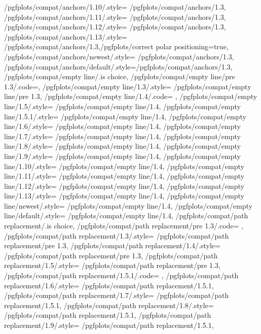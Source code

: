 {	/pgfplots/compat/anchors/1.10/.style= 	{/pgfplots/compat/anchors/1.3},%
	/pgfplots/compat/anchors/1.11/.style= 	{/pgfplots/compat/anchors/1.3},%
	/pgfplots/compat/anchors/1.12/.style= 	{/pgfplots/compat/anchors/1.3},%
	/pgfplots/compat/anchors/1.13/.style= 	{/pgfplots/compat/anchors/1.3,/pgfplots/correct polar positioning=true},%
	/pgfplots/compat/anchors/newest/.style= {/pgfplots/compat/anchors/1.3},%
	/pgfplots/compat/anchors/default/.style={/pgfplots/compat/anchors/1.3},%
	/pgfplots/compat/empty line/.is choice,
	/pgfplots/compat/empty line/pre 1.3/.code={\pgfplots@emptyline@compattrue},%
	/pgfplots/compat/empty line/1.3/.style= {/pgfplots/compat/empty line/pre 1.3},%
	/pgfplots/compat/empty line/1.4/.code= 	{\pgfplots@emptyline@compatfalse},%
	/pgfplots/compat/empty line/1.5/.style= 	{/pgfplots/compat/empty line/1.4},%
	/pgfplots/compat/empty line/1.5.1/.style= 	{/pgfplots/compat/empty line/1.4},%
	/pgfplots/compat/empty line/1.6/.style= 	{/pgfplots/compat/empty line/1.4},%
	/pgfplots/compat/empty line/1.7/.style= 	{/pgfplots/compat/empty line/1.4},%
	/pgfplots/compat/empty line/1.8/.style= 	{/pgfplots/compat/empty line/1.4},%
	/pgfplots/compat/empty line/1.9/.style= 	{/pgfplots/compat/empty line/1.4},%
	/pgfplots/compat/empty line/1.10/.style= 	{/pgfplots/compat/empty line/1.4},%
	/pgfplots/compat/empty line/1.11/.style= 	{/pgfplots/compat/empty line/1.4},%
	/pgfplots/compat/empty line/1.12/.style= 	{/pgfplots/compat/empty line/1.4},%
	/pgfplots/compat/empty line/1.13/.style= 	{/pgfplots/compat/empty line/1.4},%
	/pgfplots/compat/empty line/newest/.style=	{/pgfplots/compat/empty line/1.4},%
	/pgfplots/compat/empty line/default/.style=	{/pgfplots/compat/empty line/1.4},%
	/pgfplots/compat/path replacement/.is choice,
	/pgfplots/compat/path replacement/pre 1.3/.code= {\pgfplots@path@replace@ellipsefalse},
	/pgfplots/compat/path replacement/1.3/.style=    {/pgfplots/compat/path replacement/pre 1.3},%
	/pgfplots/compat/path replacement/1.4/.style=  	 {/pgfplots/compat/path replacement/pre 1.3},
	/pgfplots/compat/path replacement/1.5/.style=    {/pgfplots/compat/path replacement/pre 1.3},%
	/pgfplots/compat/path replacement/1.5.1/.code=   {\pgfplots@path@replace@ellipsetrue},%
	/pgfplots/compat/path replacement/1.6/.style=   	{/pgfplots/compat/path replacement/1.5.1},
	/pgfplots/compat/path replacement/1.7/.style=   	{/pgfplots/compat/path replacement/1.5.1},
	/pgfplots/compat/path replacement/1.8/.style=   	{/pgfplots/compat/path replacement/1.5.1},
	/pgfplots/compat/path replacement/1.9/.style=   	{/pgfplots/compat/path replacement/1.5.1},
}

